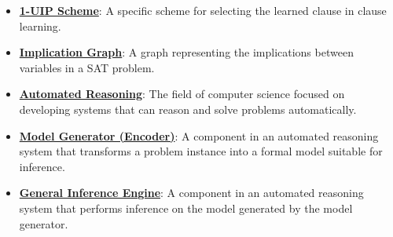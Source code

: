 \documentclass{article}%
\begin{document}
\begin{itemize}[leftmargin=*]
\item \href{https://purdue.brightspace.com/d2l/common/assets/pdfjs-d2l-dist/1.0.14-legacy/web/viewer.html?file=\%2Fcontent\%2Fenforced\%2F1095467-wl.202510.CS.24300.001\%2F15L2-SAT.pdf\%3Fou\%3D1095467\&lang=en-us\&container=d2l-fileviewer-rendered-pdf\&fullscreen=d2l-fileviewer-rendered-pdf-dialog\&height=667#page=35}{\textbf{1-UIP Scheme}}: A specific scheme for selecting the learned clause in clause learning.%
\item \href{https://purdue.brightspace.com/d2l/common/assets/pdfjs-d2l-dist/1.0.14-legacy/web/viewer.html?file=\%2Fcontent\%2Fenforced\%2F1095467-wl.202510.CS.24300.001\%2F15L2-SAT.pdf\%3Fou\%3D1095467\&lang=en-us\&container=d2l-fileviewer-rendered-pdf\&fullscreen=d2l-fileviewer-rendered-pdf-dialog\&height=667#page=35}{\textbf{Implication Graph}}: A graph representing the implications between variables in a SAT problem.%
\item \href{https://purdue.brightspace.com/d2l/common/assets/pdfjs-d2l-dist/1.0.14-legacy/web/viewer.html?file=\%2Fcontent\%2Fenforced\%2F1095467-wl.202510.CS.24300.001\%2F15L2-SAT.pdf\%3Fou\%3D1095467\&lang=en-us\&container=d2l-fileviewer-rendered-pdf\&fullscreen=d2l-fileviewer-rendered-pdf-dialog\&height=667#page=3}{\textbf{Automated Reasoning}}: The field of computer science focused on developing systems that can reason and solve problems automatically.%
\item \href{https://purdue.brightspace.com/d2l/common/assets/pdfjs-d2l-dist/1.0.14-legacy/web/viewer.html?file=\%2Fcontent\%2Fenforced\%2F1095467-wl.202510.CS.24300.001\%2F15L2-SAT.pdf\%3Fou\%3D1095467\&lang=en-us\&container=d2l-fileviewer-rendered-pdf\&fullscreen=d2l-fileviewer-rendered-pdf-dialog\&height=667#page=3}{\textbf{Model Generator (Encoder)}}: A component in an automated reasoning system that transforms a problem instance into a formal model suitable for inference.%
\item \href{https://purdue.brightspace.com/d2l/common/assets/pdfjs-d2l-dist/1.0.14-legacy/web/viewer.html?file=\%2Fcontent\%2Fenforced\%2F1095467-wl.202510.CS.24300.001\%2F15L2-SAT.pdf\%3Fou\%3D1095467\&lang=en-us\&container=d2l-fileviewer-rendered-pdf\&fullscreen=d2l-fileviewer-rendered-pdf-dialog\&height=667#page=3}{\textbf{General Inference Engine}}: A component in an automated reasoning system that performs inference on the model generated by the model generator.%
\end{itemize}

%
\end{document}
